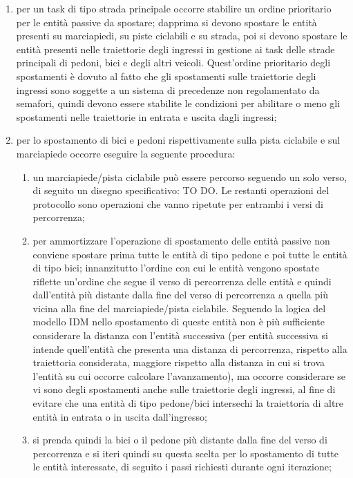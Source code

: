 \begin{enumerate}
\item per un task di tipo strada principale occorre stabilire un ordine prioritario per le entità passive da spostare; dapprima si devono spostare le entità presenti su marciapiedi, su piste ciclabili e su strada, poi si devono spostare le entità presenti nelle traiettorie degli ingressi in gestione ai task delle strade principali di pedoni, bici e degli altri veicoli. 
Quest'ordine prioritario degli spostamenti è dovuto al fatto che gli spostamenti sulle traiettorie degli ingressi sono soggette a un sistema di precedenze non regolamentato da semafori, quindi devono essere stabilite le condizioni per abilitare o meno gli spostamenti nelle traiettorie in entrata e uscita dagli ingressi;
\item per lo spostamento di bici e pedoni rispettivamente sulla pista ciclabile e sul marciapiede occorre eseguire la seguente procedura:
\begin{enumerate}
\item un marciapiede/pista ciclabile può essere percorso seguendo un solo verso, di seguito un disegno specificativo: TO DO. Le restanti operazioni del protocollo sono operazioni che vanno ripetute per entrambi i versi di percorrenza;
\item per ammortizzare l'operazione di spostamento delle entità passive non conviene spostare prima tutte le entità di tipo pedone e poi tutte le entità di tipo bici; innanzitutto l'ordine con cui le entità vengono spostate riflette un'ordine che segue il verso di percorrenza delle entità e quindi dall'entità più distante dalla fine del verso di percorrenza a quella più vicina alla fine del marciapiede/pista ciclabile. Seguendo la logica del modello IDM nello spostamento di queste entità non è più sufficiente considerare la distanza con l'entità successiva (per entità successiva si intende quell'entità che presenta una distanza di percorrenza, rispetto alla traiettoria considerata, maggiore rispetto alla distanza in cui si trova l'entità su cui occorre calcolare l'avanzamento), ma occorre considerare se vi sono degli spostamenti anche sulle traiettorie degli ingressi, al fine di evitare che una entità di tipo pedone/bici intersechi la traiettoria di altre entità in entrata o in uscita dall'ingresso;
\item si prenda quindi la bici o il pedone più distante dalla fine del verso di percorrenza e si iteri quindi su questa scelta per lo spostamento di tutte le entità interessate, di seguito i passi richiesti durante ogni iterazione;

\end{enumerate}
\end{enumerate}
